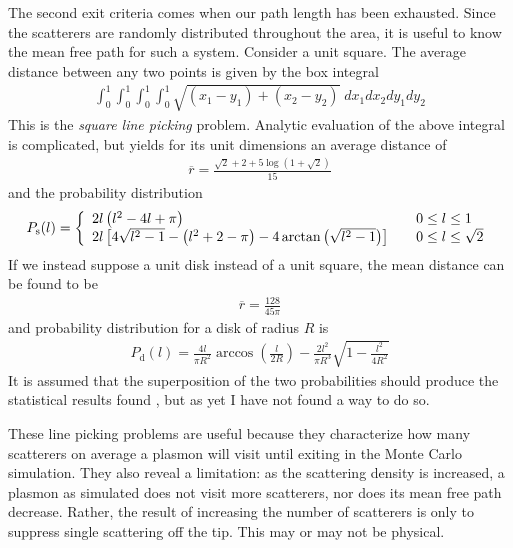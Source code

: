 The second exit criteria comes when our path length has been exhausted.
Since the scatterers are randomly distributed throughout the area, it is
useful to know the mean free path for such a system.  Consider a unit
square.  The average distance between any two points is given by the box
integral
\begin{align}
  \int_0^1 \int_0^1 \int_0^1 \int_0^1 \sqrt{(x_1-y_1)+(x_2-y_2)}\; dx_1 dx_2 dy_1 dy_2
\end{align}
This is the \textit{square line picking} problem.  Analytic evaluation of the
above integral is complicated, but yields for its unit dimensions an
average distance of
\begin{align}
  \overline{r} = \frac{\sqrt{2}+2+5\log\left(1+\sqrt{2}\right)}{15}
\end{align}
and the probability distribution
\begin{align}
  P_\mathrm{s}(l) = \left\{
  \begin{array}{l l}
    2l\left(l^2 -4l + \pi\right) & \quad  0\leq l \leq 1        \\
    2l\left[4\sqrt{l^2-1}-\left(l^2+2-\pi\right)-4\arctan\left({\sqrt{l^2-1}}\right)\right]
                                 & \quad 0 \leq l \leq \sqrt{2} \\
  \end{array}
  \right.
\end{align}
If we instead suppose a unit disk instead of a unit square, the mean
distance can be found to be
\begin{align}
  \overline{r}= \frac{128}{45 \pi}
\end{align}
and probability distribution for a disk of radius $R$ is
\begin{align}
  P_\mathrm{d}(l)=\frac{4l}{\pi R^2} \arccos\left(\frac{l}{2R}\right) - \frac{2
    l^2}{\pi R^3} \sqrt{1-\frac{l^2}{4 R^2}}
\end{align}
It is assumed that the superposition of the two probabilities should
produce the statistical results found , but as yet
I have not found a way to do so.

These line picking problems are useful because they characterize how many
scatterers on average a plasmon will visit until exiting in the Monte Carlo
simulation.  They also reveal a limitation: as the scattering density is
increased, a plasmon as simulated does not visit more scatterers, nor does
its mean free path decrease.  Rather, the result of increasing the number
of scatterers is only to suppress single scattering off the tip.  This may
or may not be physical.
